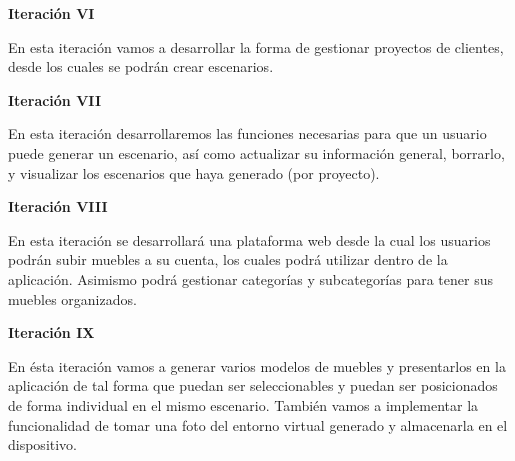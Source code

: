 \textbf{Iteración VI} \par
En esta iteración vamos a desarrollar la forma de gestionar proyectos de clientes, desde los cuales se podrán crear escenarios.

\textbf{Iteración VII} \par
En esta iteración desarrollaremos las funciones necesarias para que un usuario puede generar un escenario, así como actualizar su información general, borrarlo, y visualizar los escenarios que haya generado (por proyecto).

\textbf{Iteración VIII} \par
En esta iteración se desarrollará una plataforma web desde la cual los usuarios podrán subir muebles a su cuenta, los cuales podrá utilizar dentro de la aplicación. Asimismo podrá gestionar categorías y subcategorías para tener sus muebles organizados.

\textbf{Iteración IX} \par
En ésta iteración vamos a generar varios modelos de muebles y presentarlos en la aplicación de tal forma que puedan ser seleccionables y puedan ser posicionados de forma individual en el mismo escenario. También vamos a implementar la funcionalidad de tomar una foto del entorno virtual generado y almacenarla en el dispositivo.




